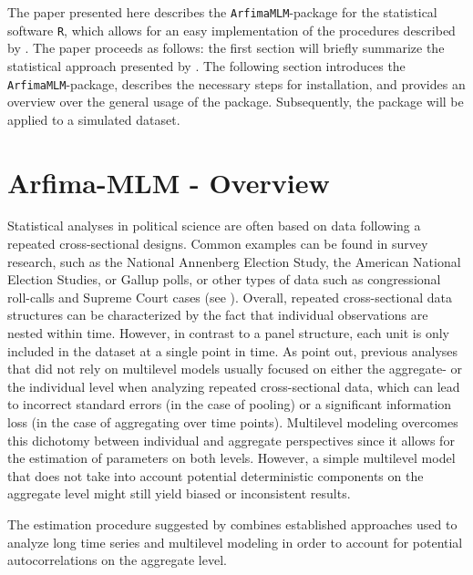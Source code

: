 \documentclass[12pt]{paper}\usepackage[]{graphicx}\usepackage[]{color}
\begin{document}
The paper presented here describes the \texttt{ArfimaMLM}-package for the statistical software \texttt{R}, which allows for an easy implementation of the procedures described by \citet{lebo2015effective}. The paper proceeds as follows: the first section will briefly summarize the statistical approach presented by \citet{lebo2015effective}. The following section introduces the \texttt{ArfimaMLM}-package, describes the necessary steps for installation, and provides an overview over the general usage of the package. Subsequently, the package will be applied to a simulated dataset.


\section{Arfima-MLM - Overview}

Statistical analyses in political science are often based on data following a repeated cross-sectional designs. Common examples can be found in survey research, such as the National Annenberg Election Study, the American National Election Studies, or Gallup polls, or other types of data such as congressional roll-calls  and Supreme Court cases (see \citealt{lebo2015effective}). Overall, repeated cross-sectional data structures can be characterized by the fact that individual observations are nested within time. However, in contrast to a panel structure, each unit is only included in the dataset at a single point in time. As \citet{lebo2015effective} point out, previous analyses that did not rely on multilevel models usually focused on either the aggregate- or the individual level when analyzing repeated cross-sectional data, which can lead to incorrect standard errors (in the case of pooling) or a significant information loss (in the case of aggregating over time points). Multilevel modeling overcomes this dichotomy between individual and aggregate perspectives since it allows for the estimation of parameters on both levels. However, a simple multilevel model that does not take into account potential deterministic components on the aggregate level might still yield biased or inconsistent results.

The estimation procedure suggested by \citet{lebo2015effective} combines established approaches used to analyze long time series and multilevel modeling in order to account for potential autocorrelations on the aggregate level.
\end{document}
